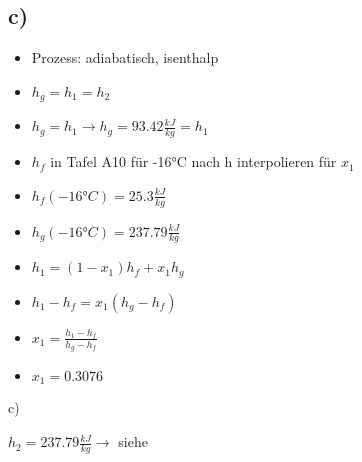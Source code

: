 

\subsection*{c)}
\begin{itemize}
    \item Prozess: adiabatisch, isenthalp
    \item \( h_{g} = h_{1} = h_{2} \)
    \item \( h_{g} = h_{1} \rightarrow h_{g} = 93.42 \frac{kJ}{kg} = h_{1} \)
    \item \( h_{f} \) in Tafel A10 für -16°C nach h interpolieren für \( x_{1} \)
    \item \( h_{f} (-16°C) = 25.3 \frac{kJ}{kg} \)
    \item \( h_{g} (-16°C) = 237.79 \frac{kJ}{kg} \)
    \item \( h_{1} = (1 - x_{1}) h_{f} + x_{1} h_{g} \)
    \item \( h_{1} - h_{f} = x_{1} (h_{g} - h_{f}) \)
    \item \( x_{1} = \frac{h_{1} - h_{f}}{h_{g} - h_{f}} \)
    \item \( x_{1} = 0.3076 \)
\end{itemize}

c)
    \item \( h_{2} = 237.79 \frac{kJ}{kg} \rightarrow \) siehe